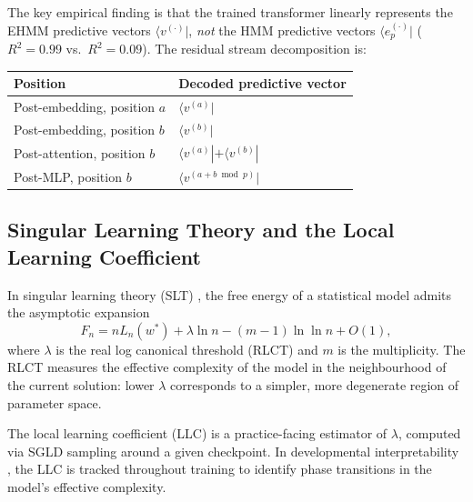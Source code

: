 \documentclass[11pt,a4paper]{article}
\begin{document}
The key empirical finding is that the trained transformer linearly represents the EHMM predictive vectors $\langle v^{(\cdot)}|$, \emph{not} the HMM predictive vectors $\langle e^{(\cdot)}_p|$ ($R^2 = 0.99$ vs.\ $R^2 = 0.09$). The residual stream decomposition is:
\begin{center}
\begin{tabular}{ll}
\toprule
\textbf{Position} & \textbf{Decoded predictive vector} \\
\midrule
Post-embedding, position $a$ & $\langle v^{(a)} |$ \\
Post-embedding, position $b$ & $\langle v^{(b)} |$ \\
Post-attention, position $b$ & $\langle v^{(a)} | + \langle v^{(b)} |$ \\
Post-MLP, position $b$ & $\langle v^{(a+b \bmod p)} |$ \\
\bottomrule
\end{tabular}
\end{center}

\subsection{Singular Learning Theory and the Local Learning Coefficient}

In singular learning theory (SLT) \citep{watanabe2009algebraic}, the free energy of a statistical model admits the asymptotic expansion
\begin{equation}
    F_n = n L_n(w^*) + \lambda \ln n - (m-1) \ln \ln n + O(1),
\end{equation}
where $\lambda$ is the real log canonical threshold (RLCT) and $m$ is the multiplicity. The RLCT measures the effective complexity of the model in the neighbourhood of the current solution: lower $\lambda$ corresponds to a simpler, more degenerate region of parameter space.

The local learning coefficient (LLC) is a practice-facing estimator of $\lambda$, computed via SGLD sampling around a given checkpoint. In developmental interpretability \citep{hoogland2024developmental}, the LLC is tracked throughout training to identify phase transitions in the model's effective complexity.
\end{document}
